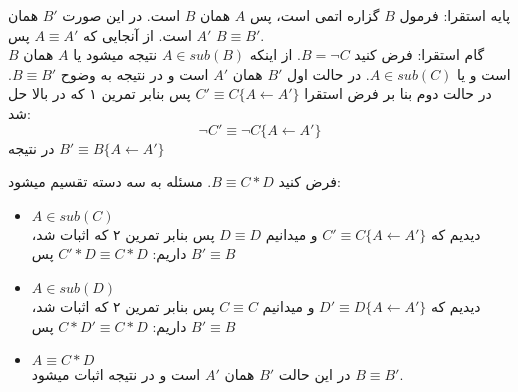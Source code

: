 \documentclass[]{exam}
\begin{document}
    پایه استقرا:
    فرمول
    $B$
    گزاره اتمی است، پس
    $A$
    همان
    $B$
    است. در این صورت
    $B'$
    همان
    $A'$
    است. از آنجایی که
    $A \equiv A'$
    پس
    $B \equiv B'$.
    \\
    گام استقرا:
    فرض کنید
    $B = \neg C$.
    از اینکه
    $A \in sub(B)$
    نتیجه میشود یا
    $A$
    همان
    $B$
    است و یا
    $A \in sub(C)$.
    در حالت اول 
    $B'$
    همان
    $A'$
    است و در نتیجه به وضوح
    $B \equiv B'$.
    در حالت دوم بنا بر فرض استقرا
    $C' \equiv C \{A \leftarrow A'\}$
    پس بنابر تمرین ۱ که در بالا حل شد:
    $$\neg C' \equiv \neg C \{A \leftarrow A'\}$$
    در نتیجه 
    $B' \equiv B \{A \leftarrow A'\}$
    
    \vspace*{0.5cm}
    فرض کنید
    $B \equiv C * D$.
    مسئله به سه دسته تقسیم میشود:
    \begin{itemize}
        \item $A \in sub(C)$ \\
        دیدیم که 
        $C' \equiv C \{A \leftarrow A'\}$
        و میدانیم
        $D \equiv D$
        پس بنابر تمرین ۲ که اثبات شد، داریم:
        $C' * D \equiv C * D$
        پس 
        $B' \equiv B$

        \item $A \in sub(D)$\\
        دیدیم که 
        $D' \equiv D \{A \leftarrow A'\}$
        و میدانیم
        $C \equiv C$
        پس بنابر تمرین ۲ که اثبات شد، داریم:
        $C * D' \equiv C * D$
        پس 
        $B' \equiv B$

        \item $A \equiv C * D$ \\
        در این حالت
        $B'$
        همان 
        $A'$
        است و در نتیجه اثبات میشود
        $B \equiv B'$.
    \end{itemize}
\end{document}
